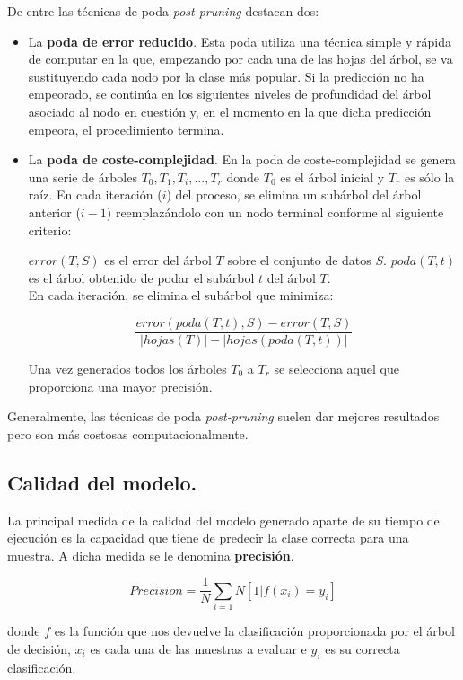 De entre las técnicas de poda \textit{post-pruning} destacan dos:\\
\begin{itemize}
\item La \textbf{poda de error reducido}. Esta poda utiliza una técnica simple y rápida de computar en la que, empezando por cada una de las hojas del árbol, se va sustituyendo cada nodo por la clase más popular. Si la predicción no ha empeorado, se continúa en los siguientes niveles de profundidad del árbol asociado al nodo en cuestión y, en el momento en la que dicha predicción empeora, el procedimiento termina.\\

\item La \textbf{poda de coste-complejidad}. En la poda de coste-complejidad se genera una serie de árboles $T_0, T_1, T_i, ... , T_r$ donde $T_0$ es el árbol inicial y $T_r$ es sólo la raíz. En cada iteración ($i$) del proceso, se elimina un subárbol del árbol anterior ($i-1$) reemplazándolo con un nodo terminal conforme al siguiente criterio:

$error(T, S)$ es el error del árbol $T$ sobre el conjunto de datos $S$. $poda(T, t)$ es el árbol obtenido de podar el subárbol $t$ del árbol $T$.\\

En cada iteración, se elimina el subárbol que minimiza:

$$
\frac{error(poda(T, t), S) - error(T, S)}{|hojas(T)| - |hojas(poda(T, t))|}
$$

Una vez generados todos los árboles $T_0$ a $T_r$ se selecciona aquel que proporciona una mayor precisión.\\

\end{itemize}
Generalmente, las técnicas de poda \textit{post-pruning} suelen dar mejores resultados pero son más costosas computacionalmente.
\subsection{Calidad del modelo.}
La principal medida de la calidad del modelo generado aparte de su tiempo de ejecución es la capacidad que tiene de predecir la clase correcta para una muestra. A dicha medida se le denomina \textbf{precisión}.

$$
Precision = \frac{1}{N}\sum_{i=1}{N}[1|f(x_i) = y_i]
$$

donde $f$ es la función que nos devuelve la clasificación proporcionada por el árbol de decisión, $x_i$ es cada una de las muestras a evaluar e $y_i$ es su correcta clasificación.


